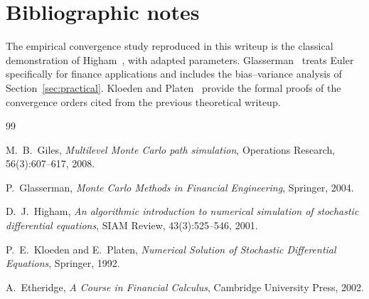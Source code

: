 \documentclass[11pt,a4paper]{article}
\theoremstyle{plain}
\theoremstyle{definition}
\theoremstyle{remark}
\begin{document}
\section{Bibliographic notes}
\label{sec:biblio}

The empirical convergence study reproduced in this writeup is the
classical demonstration of Higham~\cite{Higham2001}, with adapted
parameters. Glasserman~\cite[Chapter~6]{Glasserman} treats Euler
specifically for finance applications and includes the bias--variance
analysis of Section~\ref{sec:practical}. Kloeden and
Platen~\cite{KloedenPlaten} provide the formal proofs of the
convergence orders cited from the previous theoretical writeup.

\begin{thebibliography}{99}

M.\ B.\ Giles,
\emph{Multilevel Monte Carlo path simulation},
Operations Research, 56(3):607--617, 2008.

P.\ Glasserman,
\emph{Monte Carlo Methods in Financial Engineering},
Springer, 2004.

D.\ J.\ Higham,
\emph{An algorithmic introduction to numerical simulation of
stochastic differential equations},
SIAM Review, 43(3):525--546, 2001.

P.\ E.\ Kloeden and E.\ Platen,
\emph{Numerical Solution of Stochastic Differential Equations},
Springer, 1992.

A.\ Etheridge,
\emph{A Course in Financial Calculus},
Cambridge University Press, 2002.

\end{thebibliography}
\end{document}
